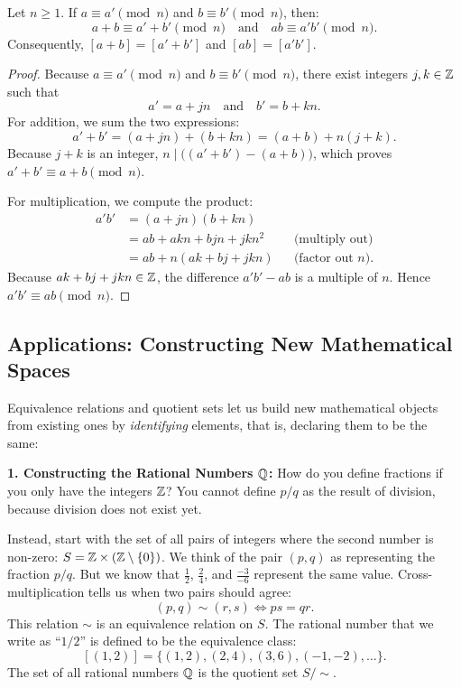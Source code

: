 \begin{lemma}
Let $n \ge 1$. If $a \equiv a' \pmod n$ and $b \equiv b' \pmod n$, then:
\[
a + b \equiv a' + b' \pmod n \quad \text{and} \quad ab \equiv a'b' \pmod n.
\]
Consequently, $[a + b] = [a' + b']$ and $[ab] = [a'b']$.
\end{lemma}

\begin{proof}
Because $a \equiv a' \pmod n$ and $b \equiv b' \pmod n$, there exist integers $j, k \in \mathbb{Z}$ such that
\[
a' = a + jn \quad \text{and} \quad b' = b + kn.
\]
For addition, we sum the two expressions:
\[
a' + b' = (a + jn) + (b + kn) = (a + b) + n(j + k).
\]
Because $j + k$ is an integer, $n \mid \bigl((a' + b') - (a + b)\bigr)$, which proves $a' + b' \equiv a + b \pmod n$.

For multiplication, we compute the product:
\begin{align*}
a' b' &= (a + jn)(b + kn)\\
&= ab + akn + bjn + jkn^2 && \text{(multiply out)}\\
&= ab + n(ak + bj + jkn) && \text{(factor out } n\text{)}.
\end{align*}
Because $ak + bj + jkn \in \mathbb{Z}$, the difference $a'b' - ab$ is a multiple of $n$. Hence $a'b' \equiv ab \pmod n$.
\end{proof}

\subsection{Applications: Constructing New Mathematical Spaces}

Equivalence relations and quotient sets let us build new mathematical objects from existing ones by \emph{identifying} elements, that is, declaring them to be the same:

\textbf{1. Constructing the Rational Numbers $\mathbb{Q}$:}
How do you define fractions if you only have the integers $\mathbb{Z}$? You cannot define $p/q$ as the result of division, because division does not exist yet.

Instead, start with the set of all pairs of integers where the second number is non-zero: $S = \mathbb{Z} \times (\mathbb{Z} \setminus \{0\})$. We think of the pair $(p, q)$ as representing the fraction $p/q$. But we know that $\frac{1}{2}$, $\frac{2}{4}$, and $\frac{-3}{-6}$ represent the same value. Cross-multiplication tells us when two pairs should agree:
\[
(p, q) \sim (r, s) \iff ps = qr.
\]
This relation $\sim$ is an equivalence relation on $S$. The rational number that we write as ``$1/2$'' is defined to be the equivalence class:
\[
[(1, 2)] = \{(1, 2), (2, 4), (3, 6), (-1, -2), \dots\}.
\]
The set of all rational numbers $\mathbb{Q}$ is the quotient set $S / \!\sim$.

